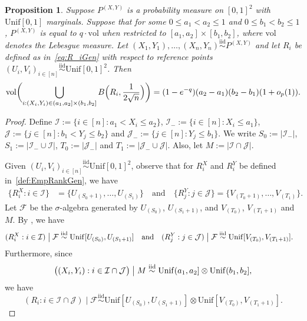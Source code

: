\documentclass[11pt]{article}
\newtheorem{prop}[thm]{Proposition}
\newcommand{\vol}{\mathrm{vol}}
\newcommand{\iid}{\stackrel{\mathrm{iid}}\sim}
\begin{document}
\begin{prop}
\label{Prop:PiecewiseConstant}
Suppose $P^{(X,Y)}$ is a probability measure on $[0,1]^2$ with $\mathrm{Unif}[0,1]$ marginals. Suppose that for some $0\leq a_1 < a_2\leq 1$ and $0\leq b_1 < b_2\leq 1$, $P^{(X,Y)}$ is equal to $q \cdot \mathrm{vol}$ when restricted to $[a_1,a_2]\times [b_1,b_2]$, where $\mathrm{vol}$ denotes the Lebesgue measure. Let $(X_1,Y_1),\ldots,(X_n,Y_n)\iid P^{(X,Y)}$ and let $R_i$ be defined as in~\eqref{eq:R_iGen} with respect to reference points $(U_i,V_i)_{i\in[n]}\iid \mathrm{Unif}[0,1]^2$. Then
\[
   \vol\biggl( \bigcup_{i: (X_i,Y_i)\in(a_1,a_2]\times (b_1,b_2]} B\Bigl(R_i, \frac{1}{2\sqrt{n}}\Bigr)\biggr) = (1-e^{-q})(a_2-a_1)(b_2-b_1)(1+o_p(1)).
\]
\end{prop}
\begin{proof}
Define $\mathcal{I} := \{i\in[n]: a_1 < X_i \leq a_2\}$, $\mathcal{I}_{-}:=\{i\in[n]:X_i \leq a_1\}$, $\mathcal{J} := \{j\in[n]: b_1 < Y_j\leq b_2\}$ and $\mathcal{J}_-:=\{j\in[n]:Y_j\leq b_1\}$. We write $S_0:= |\mathcal{I}_-|$, $S_1:=|\mathcal{I}_-\cup \mathcal{I}|$, $T_0:=|\mathcal{J}_-|$ and $T_1:=|\mathcal{J}_-\cup\mathcal{J}|$. Also, let $M := |\mathcal{I}\cap \mathcal{J}|$.

Given $(U_i,V_i)_{i\in[n]}\iid \mathrm{Unif}[0,1]^2$, observe that for $R_i^X$ and $R_i^Y$ be defined in~\eqref{def:EmpRankGen}, we have 
\begin{align*}
\{R_i^X:i\in\mathcal{I}\} &= \{U_{(S_0 + 1)}, \ldots, U_{(S_1)}\} \quad \text{and} \quad \{R_j^Y:j\in\mathcal{J}\} = \{V_{(T_0 + 1)}, \ldots, V_{(T_1)}\}.
\end{align*}
Let $\mathcal{F}$ be the $\sigma$-algebra generated by $U_{(S_0)}$, $U_{(S_1+1)}$, and $V_{(T_0)}$, $V_{(T_1+1)}$ and $M$. By \citet[Theorem~2.5]{david2004order}, we have 
    \begin{align*}
         (R_i^X: i\in\mathcal{I}) \bigm| \mathcal{F} & \iid \mathrm{Unif}[U_{(S_{0})}, U_{(S_{1} + 1)}] \quad \text{and}\quad 
          (R_j^Y: j\in\mathcal{J}) \bigm| \mathcal{F} \iid \mathrm{Unif}[V_{(T_{0})}, V_{(T_{1} + 1)}].
    \end{align*}
Furthermore, since 
\begin{align}
\bigl((X_i,Y_i):i\in \mathcal{I}\cap\mathcal{J}\bigr)\bigm| M \iid \mathrm{Unif}(a_1,a_2]\otimes \mathrm{Unif}(b_1,b_2], \label{eq:BlockUniformXY}
\end{align}
we have 
\[
    (R_i: i\in\mathcal{I}\cap\mathcal{J})\mid \mathcal{F} \iid \mathrm{Unif}[U_{(S_{0})}, U_{(S_{1} + 1)}]\otimes \mathrm{Unif}[V_{(T_{0})}, V_{(T_{1} + 1)}].
\]


\end{proof}
\end{document}

